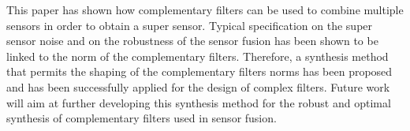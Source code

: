 
This paper has shown how complementary filters can be used to combine multiple sensors in order to obtain a super sensor.
Typical specification on the super sensor noise and on the robustness of the sensor fusion has been shown to be linked to the norm of the complementary filters.
Therefore, a synthesis method that permits the shaping of the complementary filters norms has been proposed and has been successfully applied for the design of complex filters.
Future work will aim at further developing this synthesis method for the robust and optimal synthesis of complementary filters used in sensor fusion.
